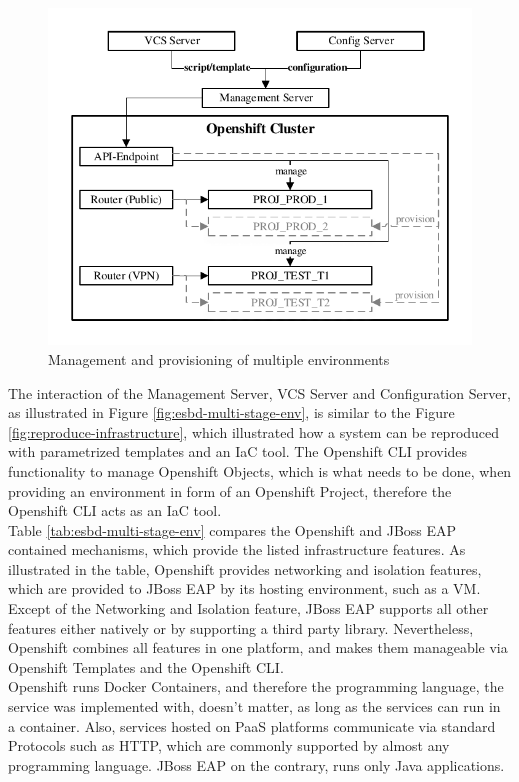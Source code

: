 \begin{figure}[htbp]
	\centering
	\includegraphics[scale=1]{images/esbd-multi-stage-env.pdf}
	\caption{Management and provisioning of multiple environments}
	\label{fig:esbd-multi-stage-env}
\end{figure}

The interaction of the Management Server, VCS Server and Configuration Server, as illustrated in Figure \vref{fig:esbd-multi-stage-env}, is similar to the Figure \vref{fig:reproduce-infrastructure}, which illustrated how a system can be reproduced with parametrized templates and an IaC tool. The Openshift CLI provides functionality to manage Openshift Objects, which is what needs to be done, when providing an environment in form of an Openshift Project, therefore the Openshift CLI acts as an IaC tool.  \\

Table \vref{tab:esbd-multi-stage-env} compares the Openshift and JBoss EAP contained mechanisms, which provide the listed infrastructure features. As illustrated in the table, Openshift provides networking and isolation features, which are provided to JBoss EAP by its hosting environment, such as a VM. Except of the Networking and Isolation feature, JBoss EAP supports all other features either natively or by supporting a third party library. Nevertheless, Openshift combines all features in one platform, and makes them manageable via Openshift Templates and the Openshift CLI. \\

Openshift runs Docker Containers, and therefore the programming language, the service was implemented with, doesn't matter, as long as the services can run in a container. Also, services hosted on PaaS platforms communicate via standard Protocols such as HTTP, which are commonly supported by almost any programming language. JBoss EAP on the contrary, runs only Java applications.


